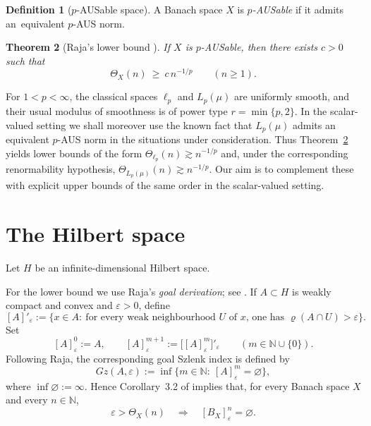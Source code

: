 \documentclass[reqno,11pt]{amsart}
\theoremstyle{plain}
\newtheorem{theorem}{Theorem}[section]
\theoremstyle{definition}
\newtheorem{definition}[theorem]{Definition}
\theoremstyle{remark}
\newcommand{\N}{\mathbb{N}}
\renewcommand{\ge}{\geqslant}
\begin{document}
\begin{definition}[$p$-AUSable space]
A Banach space $X$ is \emph{$p$-AUSable} if it admits an~equivalent $p$-AUS norm.
\end{definition}

\begin{theorem}[Raja's lower bound {\cite[Thm.~3.5]{RajaCoveringIndex}}]\label{thm:Raja-lower}
If $X$ is $p$-AUSable, then there exists $c>0$ such that
\[
\Theta_X(n)\ \ge\ c\,n^{-1/p}
\qquad(n\ge1).
\]
\end{theorem}

For $1<p<\infty$, the classical spaces $\ell_p$ and $L_p(\mu)$ are uniformly
smooth, and their usual modulus of smoothness is of power type
$r=\min\{p,2\}$. In the scalar-valued setting we shall moreover use the known
fact that $L_p(\mu)$ admits an equivalent $p$-AUS norm in the situations under
consideration. Thus Theorem~\ref{thm:Raja-lower} yields lower bounds of the
form $\Theta_{\ell_p}(n)\gtrsim n^{-1/p}$ and, under the corresponding
renormability hypothesis, $\Theta_{L_p(\mu)}(n)\gtrsim n^{-1/p}$. Our aim is
to complement these with explicit upper bounds of the same order in the
scalar-valued setting.

\section{The Hilbert space}

Let $H$ be an infinite-dimensional Hilbert space.

For the lower bound we use Raja's \emph{goal derivation}; see
\cite[Sec.~3]{RajaCoveringIndex}.  If $A\subset H$ is weakly compact and convex
and $\varepsilon>0$, define
\[
[A]'_{\varepsilon}
:=
\bigl\{
x\in A:\ \text{for every weak neighbourhood $U$ of $x$, one has }
\varrho(A\cap U)>\varepsilon
\bigr\}.
\]
Set
\[
[A]^0_{\varepsilon}:=A,
\qquad
[A]^{m+1}_{\varepsilon}:=\bigl[[A]^m_{\varepsilon}\bigr]'_{\varepsilon}
\qquad(m\in\N\cup\{0\}).
\]
Following Raja, the corresponding goal Szlenk index is defined by
\[
Gz(A,\varepsilon)
:=
\inf\{m\in\N:\ [A]^m_{\varepsilon}=\varnothing\},
\]
where $\inf\varnothing:=\infty$.
Hence Corollary~3.2 of \cite{RajaCoveringIndex} implies that, for every Banach
space $X$ and every $n\in\N$,
\begin{equation}\label{eq:goal-empty}
\varepsilon>\Theta_X(n)\quad\Longrightarrow\quad [B_X]^n_{\varepsilon}=\varnothing.
\end{equation}
\end{document}
